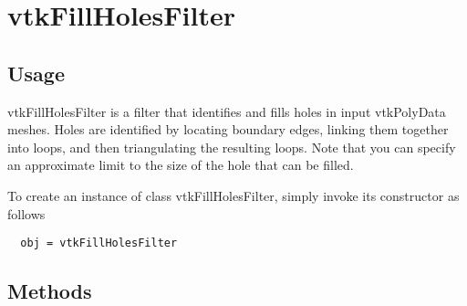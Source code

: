 \section{vtkFillHolesFilter}

\subsection{Usage}

 vtkFillHolesFilter is a filter that identifies and fills holes in
 input vtkPolyData meshes. Holes are identified by locating
 boundary edges, linking them together into loops, and then 
 triangulating the resulting loops. Note that you can specify 
 an approximate limit to the size of the hole that can be filled.
 

To create an instance of class vtkFillHolesFilter, simply
invoke its constructor as follows
\begin{verbatim}
  obj = vtkFillHolesFilter
\end{verbatim}
\subsection{Methods}

